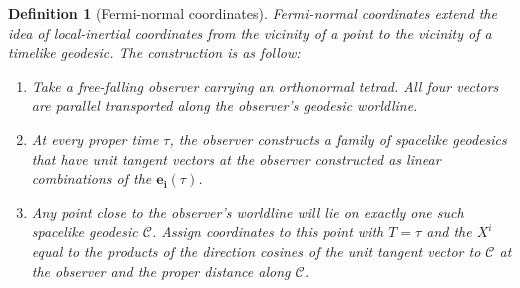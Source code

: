 \documentclass[a4paper]{article}
\theoremstyle{new}
\newtheorem{defi}{Definition}[section]
\begin{document}
\begin{defi}[Fermi-normal coordinates]
Fermi-normal coordinates extend the idea of local-inertial coordinates from the vicinity of a point to the vicinity of a timelike geodesic. The construction is as follow:
\begin{enumerate}
    \item Take a free-falling observer carrying an orthonormal tetrad. All four vectors are parallel transported along the observer's geodesic worldline.
    \item At every proper time $\tau$, the observer constructs a family of spacelike geodesics that have unit tangent vectors at the observer constructed as linear combinations of the $\mathbf{e_i}(\tau)$.
    \item Any point close to the observer's worldline will lie on exactly one such spacelike geodesic $\mathcal{C}$. Assign coordinates to this point with $T=\tau$ and the $X^i$ equal to the products of the direction cosines of the unit tangent vector to $\mathcal{C}$ at the observer and the proper distance along $\mathcal{C}$.
\end{enumerate}
\end{defi}
\newpage
\end{document}
